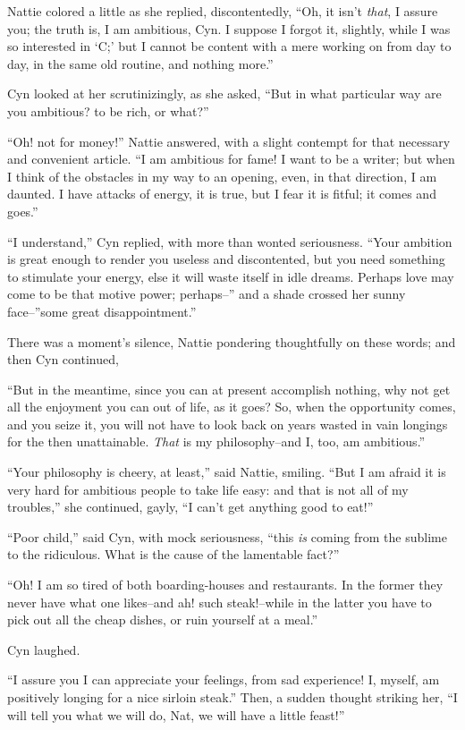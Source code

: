 Nattie colored a little as she replied, discontentedly, ``Oh, it isn't
\emph{that}, I assure you; the truth is, I am ambitious, Cyn. I suppose I
forgot it, slightly, while I was so interested in `C;' but I cannot be
content with a mere working on from day to day, in the same old routine,
and nothing more.''

Cyn looked at her scrutinizingly, as she asked, ``But in what particular
way are you ambitious? to be rich, or what?''

``Oh! not for money!'' Nattie answered, with a slight contempt for that
necessary and convenient article. ``I am ambitious for fame! I want to be
a writer; but when I think of the obstacles in my way to an opening,
even, in that direction, I am daunted. I have attacks of energy, it is
true, but I fear it is fitful; it comes and goes.''

``I understand,'' Cyn replied, with more than wonted seriousness. ``Your
ambition is great enough to render you useless and discontented, but you
need something to stimulate your energy, else it will waste itself in
idle dreams. Perhaps love may come to be that motive power; perhaps--''
and a shade crossed her sunny face--''some great disappointment.''

There was a moment's silence, Nattie pondering thoughtfully on these
words; and then Cyn continued,

``But in the meantime, since you can at present accomplish nothing, why
not get all the enjoyment you can out of life, as it goes? So, when the
opportunity comes, and you seize it, you will not have to look back on
years wasted in vain longings for the then unattainable. \emph{That} is my
philosophy--and I, too, am ambitious.''

``Your philosophy is cheery, at least,'' said Nattie, smiling. ``But I am
afraid it is very hard for ambitious people to take life easy: and that
is not all of my troubles,'' she continued, gayly, ``I can't get anything
good to eat!''

``Poor child,'' said Cyn, with mock seriousness, ``this \emph{is} coming from the
sublime to the ridiculous. What is the cause of the lamentable fact?''

``Oh! I am so tired of both boarding-houses and restaurants. In the
former they never have what one likes--and ah! such steak!--while in
the latter you have to pick out all the cheap dishes, or ruin yourself
at a meal.''

Cyn laughed.

``I assure you I can appreciate your feelings, from sad experience! I,
myself, am positively longing for a nice sirloin steak.'' Then, a sudden
thought striking her, ``I will tell you what we will do, Nat, we will
have a little feast!''

